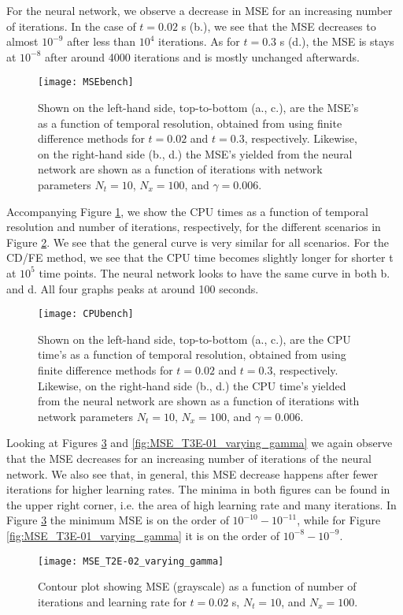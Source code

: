 For the neural network, we observe a decrease in MSE for an increasing number of iterations. In the case of $t=0.02$ s (b.), we see that the MSE decreases to almost $10^{-9}$ after less than $10^4$ iterations. As for $t=0.3$ s (d.), the MSE is stays at $10^{-8}$ after around 4000 iterations and is mostly unchanged afterwards.
\begin{figure}[htbp]
 	\centering
 	\texttt{[image: MSEbench]}
  \caption{Shown on the left-hand side, top-to-bottom (a., c.), are the MSE's as a function of temporal resolution, obtained from using finite difference methods for $t=0.02$ and $t=0.3$, respectively. Likewise, on the right-hand side (b., d.) the MSE's yielded from the neural network are shown as a function of iterations with network parameters $N_t = 10$, $N_x = 100$, and $\gamma = 0.006$.}
  \label{fig:MSEbench}
\end{figure}

Accompanying Figure \ref{fig:MSEbench}, we show the CPU times as a function of temporal resolution and number of iterations, respectively, for the different scenarios in Figure \ref{fig:CPUbench}. We see that the general curve is very similar for all scenarios. For the CD/FE method, we see that the CPU time becomes slightly longer for shorter t at $10^5$ time points. The neural network looks to have the same curve in both b. and d. All four graphs peaks at around 100 seconds.
\begin{figure}[htbp]
 	\centering
 	\texttt{[image: CPUbench]}
 	\caption{Shown on the left-hand side, top-to-bottom (a., c.), are the CPU time's as a function of temporal resolution, obtained from using finite difference methods for $t=0.02$ and $t=0.3$, respectively. Likewise, on the right-hand side (b., d.) the CPU time's yielded from the neural network are shown as a function of iterations with network parameters $N_t = 10$, $N_x = 100$, and $\gamma = 0.006$.}
  \label{fig:CPUbench}
\end{figure}

Looking at Figures \ref{fig:MSE_T2E-02_varying_gamma} and \ref{fig:MSE_T3E-01_varying_gamma} we again observe that the MSE decreases for an increasing number of iterations of the neural network. We also see that, in general, this MSE decrease happens after fewer iterations for higher learning rates. The minima in both figures can be found in the upper right corner, i.e. the area of high learning rate and many iterations. In Figure \ref{fig:MSE_T2E-02_varying_gamma} the minimum MSE is on the order of $10^{-10} - 10^{-11}$, while for Figure \ref{fig:MSE_T3E-01_varying_gamma} it is on the order of $10^{-8} - 10^{-9}$.
\begin{figure}[htbp]
 	\centering
 	\texttt{[image: MSE\_T2E-02\_varying\_gamma]}
 	\caption{Contour plot showing MSE (grayscale) as a function of number of iterations and learning rate for $t=0.02$ s, $N_t = 10$, and $N_x = 100$.}
  \label{fig:MSE_T2E-02_varying_gamma}
\end{figure}

